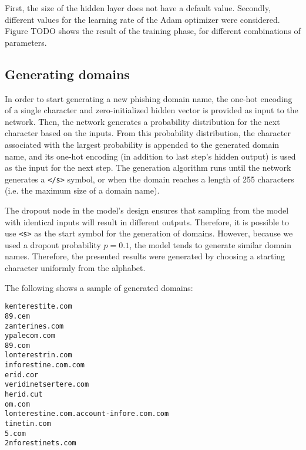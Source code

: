 First, the size of the hidden layer does not have a default value. 
Secondly, different values for the learning rate of the Adam optimizer were considered.
Figure TODO shows the result of the training phase, for different combinations of parameters.


\subsection{Generating domains}
In order to start generating a new phishing domain name, the one-hot encoding of a single character and zero-initialized hidden vector is provided as input to the network.
Then, the network generates a probability distribution for the next character based on the inputs.
From this probability distribution, the character associated with the largest probability is appended to the generated domain name, and its one-hot encoding (in addition to last step's hidden output) is used as the input for the next step.
The generation algorithm runs until the network generates a {\tt </s>} symbol, or when the domain reaches a length of 255 characters (i.e. the maximum size of a domain name).

The dropout node in the model's design ensures that sampling from the model with identical inputs will result in different outputs. 
Therefore, it is possible to use {\tt <s>} as the start symbol for the generation of domains. 
However, because we used a dropout probability $p = 0.1$, the model tends to generate similar domain names.
Therefore, the presented results were generated by choosing a starting character uniformly from the alphabet.

The following shows a sample of generated domains:
\begin{multicols}{3}
\begin{verbatim}
kenterestite.com
89.cem
zanterines.com
ypalecom.com
89.com
lonterestrin.com
inforestine.com.com
erid.cor
veridinetsertere.com
herid.cut
om.com
lonterestine.com.account-infore.com.com
tinetin.com
5.com
2nforestinets.com
\end{verbatim}
\end{multicols}